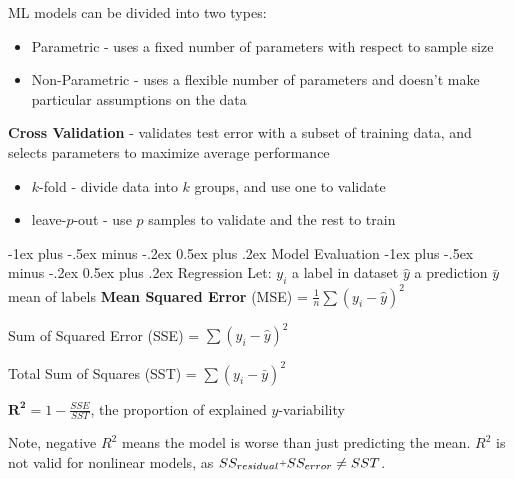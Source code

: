 \documentclass[10pt,landscape]{article}
\makeatletter
\newcommand{\plus}{\raisebox{.3\height}{\scalebox{.7}{+}}}
\renewcommand{\section}{\@startsection{section}{1}{0mm}%
                                {-1ex plus -.5ex minus -.2ex}%
                                {0.5ex plus .2ex}%
                                {\normalfont\large\bfseries}}
\renewcommand{\subsection}{\@startsection{subsection}{2}{0mm}%
                                {-1ex plus -.5ex minus -.2ex}%
                                {0.5ex plus .2ex}%
                                {\normalfont\normalsize\bfseries}}
\makeatother
\begin{document}
\begin{multicols}{3}
    \vspace{.5mm}
    ML models can be divided into two types:
    \vspace{-.5mm}
    \begin{itemize}[label={--},leftmargin=4mm]
        \itemsep -.4mm
        \item Parametric - uses a fixed number of parameters with respect to sample size
        \item Non-Parametric - uses a flexible number of parameters and doesn't make particular assumptions on the data
    \end{itemize}

    \textbf{Cross Validation} - validates test error with a subset of training data, and selects parameters to maximize average performance
    \begin{itemize}[label={--},leftmargin=4mm]
        \itemsep -.4mm
              \vspace{-1mm}
        \item $k$-fold - divide data into $k$ groups, and use one to validate
        \item leave-$p$-out  - use $p$ samples to validate and the rest to train
    \end{itemize}

    \section{Model Evaluation}
    \subsection{Regression}
    Let:
    $y_i$ a label in dataset
    $\hat{y}$ a prediction
    $\bar{y}$ mean of labels
    \textbf{Mean Squared Error} (MSE) = $\frac{1}{n}\sum (y_i -\hat{y})^2$
    \vspace{.1em}

    Sum of Squared Error (SSE) = $\sum (y_i - \hat{y})^2$

    Total Sum of Squares (SST) = $\sum (y_i - \bar{y})^2$
    \vspace{.1em}

    $\boldsymbol{R^2} = 1 - \frac{SSE}{SST}$, the proportion of explained $y$-variability

    Note, negative $R^2$ means the model is worse than just predicting the mean. $R^2$ is not valid for nonlinear models, as $SS_{residual } \plus SS_{error} \neq SST$.



\end{multicols}
\end{document}
